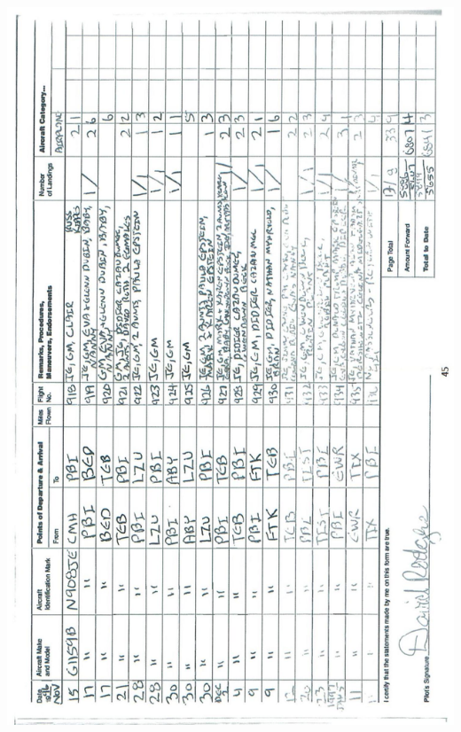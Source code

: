 \documentclass[10pt]{article}
\begin{document}
\includegraphics[max width=\textwidth, center]{2025_02_27_dd68c3d38de88f0516d9g-049}\\
\end{document}

